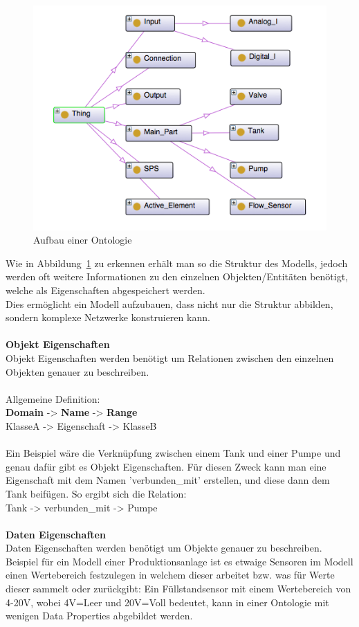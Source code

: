 
\begin{figure}[hbt!]
  \centering
  \includegraphics[width=1\textwidth]{graphics/stateoftheart/Ontology_Aufbau}
  \caption{Aufbau einer Ontologie}
	\label{fig:Ontology_Aufbau}
\end{figure}

Wie in Abbildung~\ref{fig:Ontology_Aufbau} zu erkennen erhält man so die Struktur des Modells, jedoch werden oft weitere Informationen zu den einzelnen Objekten/Entitäten benötigt, welche als Eigenschaften abgespeichert werden.\\
Dies ermöglicht ein Modell aufzubauen, dass nicht nur die Struktur abbilden, sondern komplexe Netzwerke konstruieren kann.\\
\\
\noindent \textbf{Objekt Eigenschaften}\\
Objekt Eigenschaften werden benötigt um Relationen zwischen den einzelnen Objekten genauer zu beschreiben.\\
\\
Allgemeine Definition:\\
\textbf{Domain} -> \textbf{Name} -> \textbf{Range}\\
KlasseA -> Eigenschaft -> KlasseB\\
\\
Ein Beispiel wäre die Verknüpfung zwischen einem Tank und einer Pumpe und genau dafür gibt es Objekt Eigenschaften. Für diesen Zweck kann man eine Eigenschaft mit dem Namen 'verbunden\_mit' erstellen, und diese dann dem Tank beifügen. So ergibt sich die Relation:\\
Tank -> verbunden\_mit -> Pumpe\\
\\
\textbf{Daten Eigenschaften}\\
Daten Eigenschaften werden benötigt um Objekte genauer zu beschreiben. 
\\
Beispiel für ein Modell einer Produktionsanlage ist es etwaige Sensoren im Modell einen Wertebereich festzulegen in welchem dieser arbeitet bzw. was für Werte dieser sammelt oder zurückgibt: Ein Füllstandsensor mit einem Wertebereich von 4-20V, wobei 4V=Leer und 20V=Voll bedeutet, kann in einer Ontologie mit wenigen Data Properties abgebildet werden.

